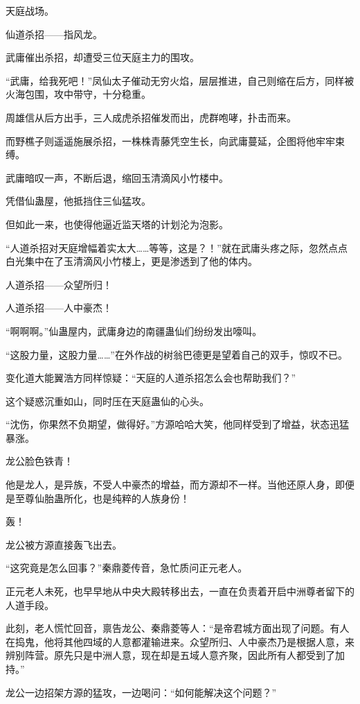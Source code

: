 
\begin{this_body}

天庭战场。

仙道杀招——指风龙。

武庸催出杀招，却遭受三位天庭主力的围攻。

“武庸，给我死吧！”凤仙太子催动无穷火焰，层层推进，自己则缩在后方，同样被火海包围，攻中带守，十分稳重。

周雄信从后方出手，三人成虎杀招催发而出，虎群咆哮，扑击而来。

而野樵子则遥遥施展杀招，一株株青藤凭空生长，向武庸蔓延，企图将他牢牢束缚。

武庸暗叹一声，不断后退，缩回玉清滴风小竹楼中。

凭借仙蛊屋，他抵挡住三仙猛攻。

但如此一来，也使得他逼近监天塔的计划沦为泡影。

“人道杀招对天庭增幅着实太大……等等，这是？！”就在武庸头疼之际，忽然点点白光集中在了玉清滴风小竹楼上，更是渗透到了他的体内。

人道杀招——众望所归！

人道杀招——人中豪杰！

“啊啊啊。”仙蛊屋内，武庸身边的南疆蛊仙们纷纷发出嚎叫。

“这股力量，这股力量……”在外作战的树翁巴德更是望着自己的双手，惊叹不已。

变化道大能翼浩方同样惊疑：“天庭的人道杀招怎么会也帮助我们？”

这个疑惑沉重如山，同时压在天庭蛊仙的心头。

“沈伤，你果然不负期望，做得好。”方源哈哈大笑，他同样受到了增益，状态迅猛暴涨。

龙公脸色铁青！

他是龙人，是异族，不受人中豪杰的增益，而方源却不一样。当他还原人身，即便是至尊仙胎蛊所化，也是纯粹的人族身份！

轰！

龙公被方源直接轰飞出去。

“这究竟是怎么回事？”秦鼎菱传音，急忙质问正元老人。

正元老人未死，也早早地从中央大殿转移出去，一直在负责着开启中洲尊者留下的人道手段。

此刻，老人慌忙回音，禀告龙公、秦鼎菱等人：“是帝君城方面出现了问题。有人在捣鬼，他将其他四域的人意都灌输进来。众望所归、人中豪杰乃是根据人意，来辨别阵营。原先只是中洲人意，现在却是五域人意齐聚，因此所有人都受到了加持。”

龙公一边招架方源的猛攻，一边喝问：“如何能解决这个问题？”


\end{this_body}
